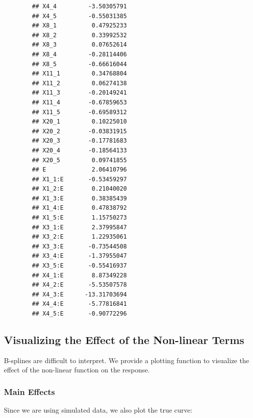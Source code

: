 \begin{knitrout}
\begin{kframe}
\begin{verbatim}
		## X4_4         -3.50305791
		## X4_5         -0.55031385
		## X8_1          0.47925233
		## X8_2          0.33992532
		## X8_3          0.07652614
		## X8_4         -0.28114406
		## X8_5         -0.66616044
		## X11_1         0.34768804
		## X11_2         0.06274138
		## X11_3        -0.20149241
		## X11_4        -0.67859653
		## X11_5        -0.69589312
		## X20_1         0.10225010
		## X20_2        -0.03831915
		## X20_3        -0.17781683
		## X20_4        -0.18564133
		## X20_5         0.09741855
		## E             2.06410796
		## X1_1:E       -0.53459297
		## X1_2:E        0.21040020
		## X1_3:E        0.38385439
		## X1_4:E        0.47838792
		## X1_5:E        1.15750273
		## X3_1:E        2.37995847
		## X3_2:E        1.22935061
		## X3_3:E       -0.73544508
		## X3_4:E       -1.37955047
		## X3_5:E       -0.55416937
		## X4_1:E        8.87349228
		## X4_2:E       -5.53507578
		## X4_3:E      -13.31703694
		## X4_4:E       -5.77816841
		## X4_5:E       -0.90772296
		\end{verbatim}
	\end{kframe}
\end{knitrout}



\subsection{Visualizing the Effect of the Non-linear Terms}

B-splines are difficult to interpret. We provide a plotting function to visualize the effect of the non-linear function on the response.

\subsubsection{Main Effects}

Since we are using simulated data, we also plot the true curve:

